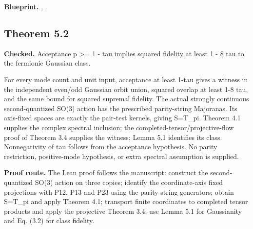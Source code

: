 \textbf{Blueprint.} , .

\subsection{Theorem 5.2}\label{paper:r5-2}
\textbf{Checked.} Acceptance p >= 1 - tau implies squared fidelity at least 1 - 8 tau to the fermionic Gaussian class. 

For every mode count and unit input, acceptance at least 1-tau gives a witness in the independent even/odd Gaussian orbit union, squared overlap at least 1-8 tau, and the same bound for squared supremal fidelity. The actual strongly continuous second-quantized SO(3) action has the prescribed parity-string Majoranas. Its axis-fixed spaces are exactly the pair-test kernels, giving S=T\_pi. Theorem 4.1 supplies the complex spectral inclusion; the completed-tensor/projective-flow proof of Theorem 3.4 supplies the witness; Lemma 5.1 identifies its class. Nonnegativity of tau follows from the acceptance hypothesis. No parity restriction, positive-mode hypothesis, or extra spectral assumption is supplied.

\textbf{Proof route.} The Lean proof follows the manuscript: construct the second-quantized SO(3) action on three copies; identify the coordinate-axis fixed projections with P12, P13 and P23 using the parity-string generators; obtain S=T\_pi and apply Theorem 4.1; transport finite coordinates to completed tensor products and apply the projective Theorem 3.4; use Lemma 5.1 for Gaussianity and Eq. (3.2) for class fidelity.


